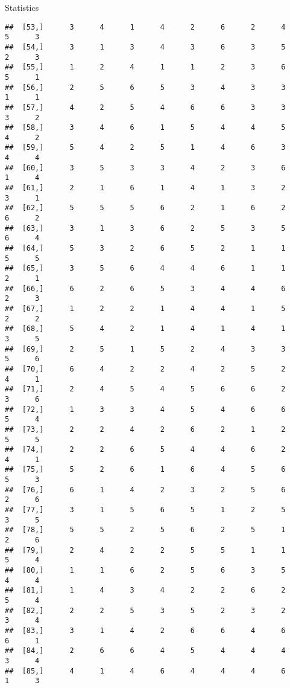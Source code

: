 \documentclass[
  ignorenonframetext,
]{beamer}
\begin{document}
\begin{frame}[fragile]{Statistics}
\begin{verbatim}
##  [53,]      3      4      1      4      2      6      2      4      5      3
##  [54,]      3      1      3      4      3      6      3      5      2      3
##  [55,]      1      2      4      1      1      2      3      6      5      1
##  [56,]      2      5      6      5      3      4      3      3      1      1
##  [57,]      4      2      5      4      6      6      3      3      3      2
##  [58,]      3      4      6      1      5      4      4      5      4      2
##  [59,]      5      4      2      5      1      4      6      3      4      4
##  [60,]      3      5      3      3      4      2      3      6      1      4
##  [61,]      2      1      6      1      4      1      3      2      3      1
##  [62,]      5      5      5      6      2      1      6      2      6      2
##  [63,]      3      1      3      6      2      5      3      5      6      4
##  [64,]      5      3      2      6      5      2      1      1      5      5
##  [65,]      3      5      6      4      4      6      1      1      2      1
##  [66,]      6      2      6      5      3      4      4      6      2      3
##  [67,]      1      2      2      1      4      4      1      5      2      2
##  [68,]      5      4      2      1      4      1      4      1      3      5
##  [69,]      2      5      1      5      2      4      3      3      5      6
##  [70,]      6      4      2      2      4      2      5      2      4      1
##  [71,]      2      4      5      4      5      6      6      2      3      6
##  [72,]      1      3      3      4      5      4      6      6      5      4
##  [73,]      2      2      4      2      6      2      1      2      5      5
##  [74,]      2      2      6      5      4      4      6      2      4      1
##  [75,]      5      2      6      1      6      4      5      6      5      3
##  [76,]      6      1      4      2      3      2      5      6      2      6
##  [77,]      3      1      5      6      5      1      2      5      3      5
##  [78,]      5      5      2      5      6      2      5      1      2      6
##  [79,]      2      4      2      2      5      5      1      1      5      4
##  [80,]      1      1      6      2      5      6      3      5      4      4
##  [81,]      1      4      3      4      2      2      6      2      5      4
##  [82,]      2      2      5      3      5      2      3      2      3      4
##  [83,]      3      1      4      2      6      6      4      6      6      1
##  [84,]      2      6      6      4      5      4      4      4      3      4
##  [85,]      4      1      4      6      4      4      4      6      1      3

\end{verbatim}
\end{frame}
\end{document}
